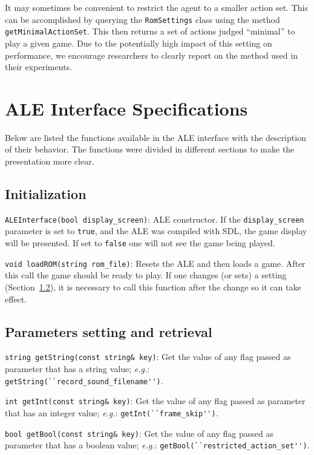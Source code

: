 \documentclass[12pt]{article}
\begin{document}
It may sometimes be convenient to restrict the agent to a smaller action set. This can be
accomplished by querying the \verb+RomSettings+ class using the method 
\verb+getMinimalActionSet+. This then returns a set of actions judged ``minimal'' to play a given
game. Due to the potentially high impact of this setting on performance, we encourage researchers
to clearly report on the method used in their experiments. 

\section{ALE Interface Specifications}\label{sec:functions}

Below are listed the functions available in the ALE interface with the description of their 
behavior. The functions were divided in different sections to make the presentation more
clear.

  \subsection{Initialization}

  \indent \indent \verb+ALEInterface(bool display_screen)+: ALE constructor. If the 
  \verb+display_screen+ parameter is set to \verb+true+, and the ALE was compiled
  with SDL, the game display will be presented. If set to \verb+false+ one will not see
  the game being played.
  
  \verb+void loadROM(string rom_file)+: Resets the ALE and then loads a game. After this call
  the game should be ready to play. If one changes (or sets) a setting (Section~\ref{sec:getSet}), 
  it is necessary to call this function after the change so it can take effect.
  
  \subsection{Parameters setting and retrieval}\label{sec:getSet}
  
  \indent \indent \verb+string getString(const string& key)+: Get the value of any flag passed
  as parameter that has a string value; \emph{e.g.}: \verb+getString(``record_sound_filename'')+.

  \verb+int getInt(const string& key)+: Get the value of any flag passed as parameter that has 
  an integer value; \emph{e.g.}: \verb+getInt(``frame_skip'')+.

  \verb+bool getBool(const string& key)+: Get the value of any flag passed as parameter that has 
  a boolean value; \emph{e.g.}: \verb+getBool(``restricted_action_set'')+. 
  
\end{document}

